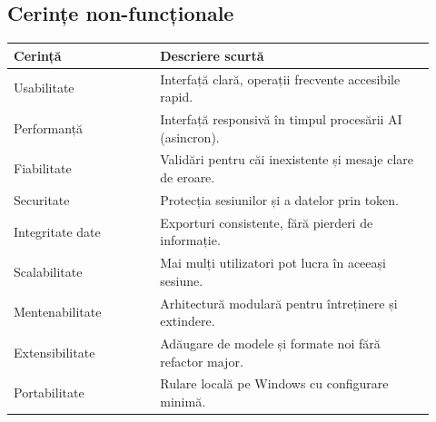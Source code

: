\subsection{Cerințe non-funcționale}
\begin{center}
\begin{tabular}{|p{0.32\linewidth}|p{0.6\linewidth}|}
\hline
\textbf{Cerință} & \textbf{Descriere scurtă} \\
\hline
Usabilitate & Interfață clară, operații frecvente accesibile rapid. \\
\hline
Performanță & Interfață responsivă în timpul procesării AI (asincron). \\
\hline
Fiabilitate & Validări pentru căi inexistente și mesaje clare de eroare. \\
\hline
Securitate & Protecția sesiunilor și a datelor prin token. \\
\hline
Integritate date & Exporturi consistente, fără pierderi de informație. \\
\hline
Scalabilitate & Mai mulți utilizatori pot lucra în aceeași sesiune. \\
\hline
Mentenabilitate & Arhitectură modulară pentru întreținere și extindere. \\
\hline
Extensibilitate & Adăugare de modele și formate noi fără refactor major. \\
\hline
Portabilitate & Rulare locală pe Windows cu configurare minimă. \\
\hline
\end{tabular}
\end{center}
\renewcommand{\arraystretch}{1.0}
